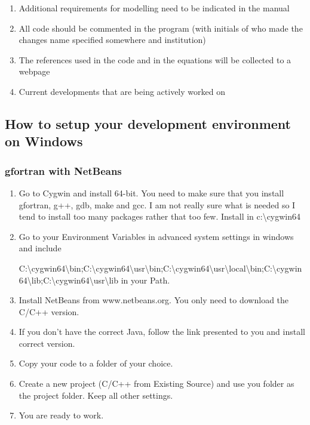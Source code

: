 \documentclass[letterpaper,10pt,english]{sphinxmanual}
\begin{document}
\begin{enumerate}
\item {} 
Additional requirements for modelling need to be indicated in the
manual

\item {} 
All code should be commented in the program (with initials of who
made the changes \textendash{} name specified somewhere and institution)

\item {} 
The references used in the code and in the equations will be
collected to a webpage

\item {} 
Current developments that are being actively worked on

\end{enumerate}


\subsection{How to setup your development environment on Windows}
\label{\detokenize{DevelopmentGuidelines:how-to-setup-your-development-environment-on-windows}}

\subsubsection{gfortran with NetBeans}
\label{\detokenize{DevelopmentGuidelines:gfortran-with-netbeans}}\begin{enumerate}
\item {} 
Go to Cygwin and install 64-bit. You need to make sure that you
install gfortran, g++, gdb, make and gcc. I am not really sure what
is needed so I tend to install too many packages rather that too few.
Install in c:\textbackslash{}cygwin64

\item {} 
Go to your Environment Variables in advanced system settings in
windows and include

C:\textbackslash{}cygwin64\textbackslash{}bin;C:\textbackslash{}cygwin64\textbackslash{}usr\textbackslash{}bin;C:\textbackslash{}cygwin64\textbackslash{}usr\textbackslash{}local\textbackslash{}bin;C:\textbackslash{}cygwin64\textbackslash{}lib;C:\textbackslash{}cygwin64\textbackslash{}usr\textbackslash{}lib
in your Path.

\item {} 
Install NetBeans from www.netbeans.org. You only need to download the
C/C++ version.

\item {} 
If you don’t have the correct Java, follow the link presented to you
and install correct version.

\item {} 
Copy your code to a folder of your choice.

\item {} 
Create a new project (C/C++ from Existing Source) and use you folder
as the project folder. Keep all other settings.

\item {} 
You are ready to work.

\end{enumerate}
\end{document}
